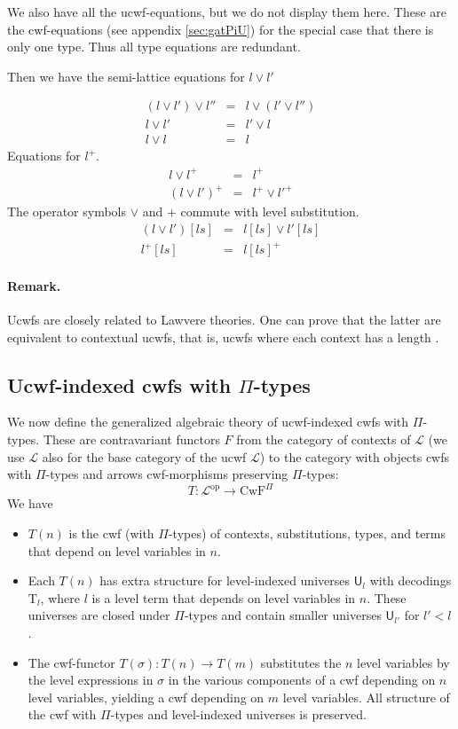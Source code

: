 \documentclass[11pt,a4paper]{article}
\theoremstyle{definition}
\newcommand{\UU}{\mathsf{U}}
\def\UU{\mathsf{U}}
\newcommand{\Ta}{\mathrm{T}}
\def\L{{\mathcal{L}}}
\def\CwF{\mathrm{CwF}}
\begin{document}
We also have all the ucwf-equations, but we do not display them here. These are the cwf-equations (see appendix   \ref{sec:gatPiU}) for the special case that there is only one type. Thus all type equations are redundant.

Then we have the semi-lattice equations for $l \vee l'$

\begin{eqnarray*}
(l \vee l') \vee l'' &=& l \vee (l' \vee l'')\\
l \vee l' &=& l'\vee l\\
l \vee l &=& l
\end{eqnarray*}
Equations for $l^+$.
\begin{eqnarray*}
l \vee l^+ &=& l^+\\
(l\vee l')^+ &=& l^+\vee l'^+
\end{eqnarray*}
The operator symbols $\vee$ and $+$ commute with level substitution.
\begin{eqnarray*}
(l \vee l')[ls] &=& l[ls] \vee l' [ls]\\
 l^+[ls] &=&  l[ls]^+
\end{eqnarray*}
\paragraph{Remark.} Ucwfs are closely related to Lawvere theories. One can prove that the latter are equivalent to contextual ucwfs, that is, ucwfs where each context has a length \cite{CCD:lambek}.

\subsection{Ucwf-indexed cwfs  with $\Pi$-types}

We now define the generalized algebraic theory of ucwf-indexed cwfs with $\Pi$-types. These are contravariant functors $F$ from the category of contexts of $\L$ (we use $\L$ also for the base category of the ucwf $\L$)  to the category with objects cwfs with $\Pi$-types and arrows cwf-morphisms preserving $\Pi$-types:
$$
T : \L^\mathrm{op} \to \CwF^{\Pi}
$$
We have
\begin{itemize}
\item
$T(n)$ is the cwf (with $\Pi$-types) of contexts, substitutions, types, and terms that depend on level variables in $n$.
\item
Each $T(n)$ has extra structure for level-indexed universes $\UU_l$ with decodings $\Ta_l$, where $l$ is a level term that depends on level variables in $n$. These universes are closed under $\Pi$-types and contain smaller universes $\UU_{l'}$ for $l' < l$.
\item
The cwf-functor $T(\sigma) : T(n) \to T(m)$ substitutes the $n$ level variables by the level expressions in $\sigma$ in the various components of a cwf depending on $n$ level variables, yielding a cwf depending on $m$ level variables. All structure of the cwf with $\Pi$-types and level-indexed universes is preserved.
\end{itemize}
\end{document}
